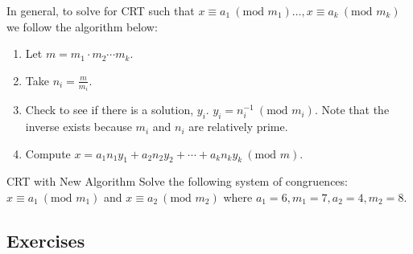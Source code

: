 \begin{note}
    In general, to solve for CRT such that \(x \equiv a_1 \ (\text{mod } m_1)\dots, x \equiv a_k \ (\text{mod } m_k)\) we follow the algorithm below:
    \begin{enumerate}
        \item Let \(m = m_1 \cdot m_2 \cdots m_k\).
        \item Take \(n_i = \frac{m}{m_i}\).
        \item  Check to see if there is a solution, \(y_i\). \(y_i = n_i^{-1} \ (\text{mod } m_i)\). Note that the inverse exists because \(m_i\) and \(n_i\) are relatively prime.
        \item Compute \(x = a_1n_1y_1 + a_2n_2y_2 + \cdots + a_kn_ky_k \ (\text{mod } m)\).
    \end{enumerate}
\end{note}

\begin{example}
    {CRT with New Algorithm}
    Solve the following system of congruences: \(x \equiv a_1 \ (\text{mod } m_1)\) and \(x \equiv a_2 \ (\text{mod } m_2)\) where \(a_1 = 6, m_1 = 7, a_2 = 4, m_2 = 8\).
\end{example}


\renewcommand{\theenumi}{\alph{enumi}}
\renewcommand{\labelenumi}{(\theenumi)}
\subsection{Exercises}



